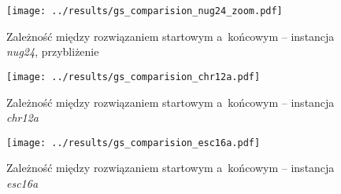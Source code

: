 \documentclass{article}
\begin{document}
			\begin{figure}[h]
				\texttt{[image: ../results/gs\_comparision\_nug24\_zoom.pdf]}
				\caption{Zależność między rozwiązaniem startowym a~końcowym -- instancja \emph{nug24}\label{fig:gs.nug24_zoom}, przybliżenie}				
			\end{figure}
			
			\begin{figure}[h]
				\texttt{[image: ../results/gs\_comparision\_chr12a.pdf]}
				\caption{Zależność między rozwiązaniem startowym a~końcowym -- instancja \emph{chr12a}\label{fig:gs.chr12a}}				
			\end{figure}
			
			\begin{figure}[h]
				\texttt{[image: ../results/gs\_comparision\_esc16a.pdf]}
				\caption{Zależność między rozwiązaniem startowym a~końcowym -- instancja \emph{esc16a}\label{fig:gs.esc16a}}				
			\end{figure}
		
\end{document}
